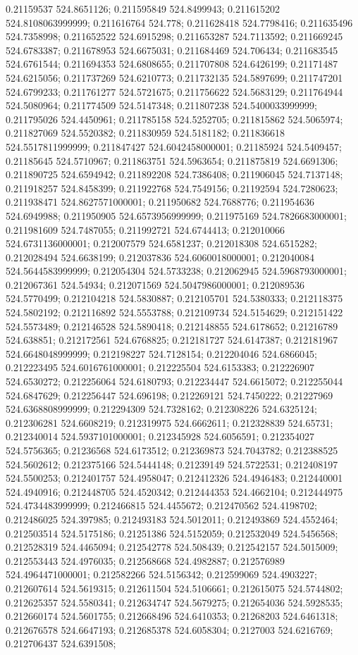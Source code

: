 0.21159537 524.8651126; 0.211595849 524.8499943; 0.211615202 524.8108063999999; 0.211616764 524.778; 0.211628418 524.7798416; 0.211635496 524.7358998; 0.211652522 524.6915298; 0.211653287 524.7113592; 0.211669245 524.6783387; 0.211678953 524.6675031; 0.211684469 524.706434; 0.211683545 524.6761544; 0.211694353 524.6808655; 0.211707808 524.6426199; 0.21171487 524.6215056; 0.211737269 524.6210773; 0.211732135 524.5897699; 0.211747201 524.6799233; 0.211761277 524.5721675; 0.211756622 524.5683129; 0.211764944 524.5080964; 0.211774509 524.5147348; 0.211807238 524.5400033999999; 0.211795026 524.4450961; 0.211785158 524.5252705; 0.211815862 524.5065974; 0.211827069 524.5520382; 0.211830959 524.5181182; 0.211836618 524.5517811999999; 0.211847427 524.6042458000001; 0.21185924 524.5409457; 0.21185645 524.5710967; 0.211863751 524.5963654; 0.211875819 524.6691306; 0.211890725 524.6594942; 0.211892208 524.7386408; 0.211906045 524.7137148; 0.211918257 524.8458399; 0.211922768 524.7549156; 0.21192594 524.7280623; 0.211938471 524.8627571000001; 0.211950682 524.7688776; 0.211954636 524.6949988; 0.211950905 524.6573956999999; 0.211975169 524.7826683000001; 0.211981609 524.7487055; 0.211992721 524.6744413; 0.212010066 524.6731136000001; 0.212007579 524.6581237; 0.212018308 524.6515282; 0.212028494 524.6638199; 0.212037836 524.6060018000001; 0.212040084 524.5644583999999; 0.212054304 524.5733238; 0.212062945 524.5968793000001; 0.212067361 524.54934; 0.212071569 524.5047986000001; 0.212089536 524.5770499; 0.212104218 524.5830887; 0.212105701 524.5380333; 0.212118375 524.5802192; 0.212116892 524.5553788; 0.212109734 524.5154629; 0.212151422 524.5573489; 0.212146528 524.5890418; 0.212148855 524.6178652; 0.21216789 524.638851; 0.212172561 524.6768825; 0.212181727 524.6147387; 0.212181967 524.6648048999999; 0.212198227 524.7128154; 0.212204046 524.6866045; 0.212223495 524.6016761000001; 0.212225504 524.6153383; 0.212226907 524.6530272; 0.212256064 524.6180793; 0.212234447 524.6615072; 0.212255044 524.6847629; 0.212256447 524.696198; 0.212269121 524.7450222; 0.21227969 524.6368808999999; 0.212294309 524.7328162; 0.212308226 524.6325124; 0.212306281 524.6608219; 0.212319975 524.6662611; 0.212328839 524.65731; 0.212340014 524.5937101000001; 0.212345928 524.6056591; 0.212354027 524.5756365; 0.21236568 524.6173512; 0.212369873 524.7043782; 0.212388525 524.5602612; 0.212375166 524.5444148; 0.21239149 524.5722531; 0.212408197 524.5500253; 0.212401757 524.4958047; 0.212412326 524.4946483; 0.212440001 524.4940916; 0.212448705 524.4520342; 0.212444353 524.4662104; 0.212444975 524.4734483999999; 0.212466815 524.4455672; 0.212470562 524.4198702; 0.212486025 524.397985; 0.212493183 524.5012011; 0.212493869 524.4552464; 0.212503514 524.5175186; 0.21251386 524.5152059; 0.212532049 524.5456568; 0.212528319 524.4465094; 0.212542778 524.508439; 0.212542157 524.5015009; 0.212553443 524.4976035; 0.212568668 524.4982887; 0.212576989 524.4964471000001; 0.212582266 524.5156342; 0.212599069 524.4903227; 0.212607614 524.5619315; 0.212611504 524.5106661; 0.212615075 524.5744802; 0.212625357 524.5580341; 0.212634747 524.5679275; 0.212654036 524.5928535; 0.212660174 524.5601755; 0.212668496 524.6410353; 0.21268203 524.6461318; 0.212676578 524.6647193; 0.212685378 524.6058304; 0.2127003 524.6216769; 0.212706437 524.6391508; 
